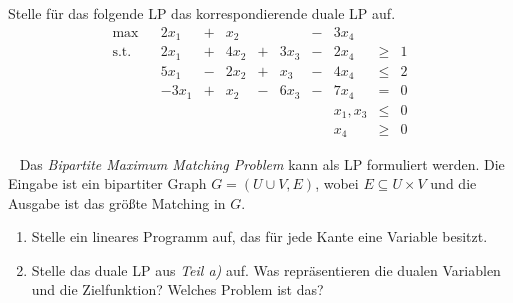 \documentclass{uebung_cs}
\begin{document}
\begin{aufgabe}
	Stelle für das folgende \acs{LP} das korrespondierende duale \acs{LP} auf.
	\[
		\begin{array}{rrrlllllllll}
		\text{max}    &     &   2 x_1       &   +     &   x_2   &       &         &   -   & 3x_4  &         &   \\
		\text{s.t.}  &     &   2x_1      &   +     &   4x_2  &   +   &  3 x_3   &   -   & 2x_4   &  \geq   & 1 \\
							&     &   5x_1      &   -     &   2x_2   &   +   &   x_3  &   -   & 4x_4  &  \leq   & 2 \\
							&     &   -3x_1     & +     &   x_2  &   -   &   6x_3  &   -   & 7 x_4   &   =     & 0 \\
							&     &           &       &         &       &       &         &x_1,x_3   & \leq    &   0      \\
							&     &          &       &         &       &       &         &  x_4       & \geq    &   0    
		\end{array}
	\]
	
\end{aufgabe}

\begin{aufgabe}\
	Das \emph{Bipartite Maximum Matching Problem} kann als \acs{LP} formuliert werden. Die Eingabe ist ein bipartiter Graph $G = (U \cup V, E)$, wobei $E \subseteq U \times V$ und die Ausgabe ist das größte Matching in $G$.
	\begin{enumerate}
		\item Stelle ein lineares Programm auf, das für jede Kante eine Variable besitzt.
		\item Stelle das duale \acs{LP} aus \emph{Teil a)} auf. Was repräsentieren die dualen Variablen und die Zielfunktion? Welches Problem ist das?
	\end{enumerate}
\end{aufgabe}
\end{document}
